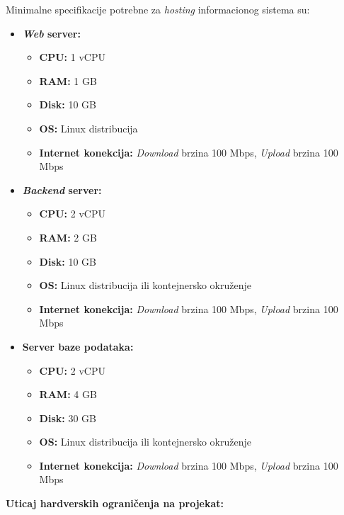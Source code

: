 Minimalne specifikacije potrebne za \textit{hosting} informacionog sistema su:
\begin{itemize}
    \item \textbf{\textit{Web }server:}
        \begin{itemize}
            \item \textbf{CPU:} 1 vCPU
            \item \textbf{RAM:} 1 GB
            \item \textbf{Disk:} 10 GB
            \item \textbf{OS:} Linux distribucija
            \item \textbf{Internet konekcija:} \textit{Download} brzina 100 Mbps, \textit{Upload} brzina 100 Mbps
        \end{itemize}
    \item \textbf{\textit{Backend }server:}
        \begin{itemize}
            \item \textbf{CPU:} 2 vCPU
            \item \textbf{RAM:} 2 GB
            \item \textbf{Disk:} 10 GB
            \item \textbf{OS:} Linux distribucija ili kontejnersko okruženje
            \item \textbf{Internet konekcija:} \textit{Download} brzina 100 Mbps, \textit{Upload} brzina 100 Mbps
        \end{itemize}
    \item \textbf{Server baze podataka:}
        \begin{itemize}
            \item \textbf{CPU:} 2 vCPU
            \item \textbf{RAM:} 4 GB
            \item \textbf{Disk:} 30 GB
            \item \textbf{OS:} Linux distribucija ili kontejnersko okruženje
            \item \textbf{Internet konekcija:} \textit{Download} brzina 100 Mbps, \textit{Upload} brzina 100 Mbps
        \end{itemize}
\end{itemize}

\textbf{Uticaj hardverskih ograničenja na projekat:}

